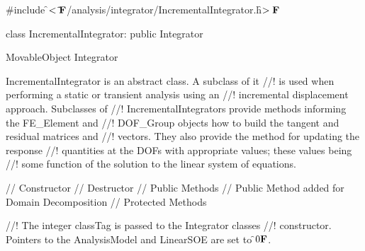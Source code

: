 
\indent \#include \f$<\tilde{ }{\bf F}$/analysis/integrator/IncrementalIntegrator.h\f$>{\bf F}$

\indent class IncrementalIntegrator: public Integrator

\indent MovableObject
\indent\indent Integrator
\indent\indent{}

\indent IncrementalIntegrator is an abstract class. A subclass of it
//! is used when performing a static or transient analysis using an
//! incremental displacement approach. Subclasses of
//! IncrementalIntegrators provide methods informing the FE\_Element and
//! DOF\_Group objects how to build the tangent and residual matrices and
//! vectors. They also provide the method for updating the response
//! quantities at the DOFs with appropriate values; these values being
//! some function of the solution to the linear system of equations. 

\indent\indent // Constructor
\indent{}
\indent\indent // Destructor
\indent{}
\indent\indent // Public Methods
\indent{}  
\indent{}
\indent{}
\indent{}
\indent{}
\indent{}
\indent{}
\indent{} 
\indent{}
\indent\indent // Public Method added for Domain Decomposition
\indent{}
\indent\indent // Protected Methods
\indent{}
\indent{}
\indent{}
\indent{}

//! The integer \p classTag is passed to the Integrator classes
//! constructor. Pointers to the AnalysisModel and LinearSOE are set to
\f$0{\bf F}$.

